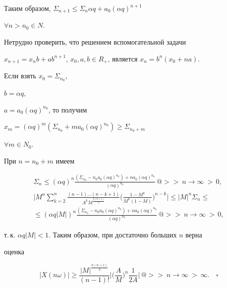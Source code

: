  


Таким образом, $\Sigma_{n+1}\le\Sigma_n \alpha q+a_0(\alpha q)^{n+1}$ 


$\forall n>n_0\in N$. 


 


Нетрудно проверить, что решением вспомогательной задачи 


$x_{n+1}=x_n b+a b^{n+1}$, $x_0,a,b\in R_+$, является $x_n=b^n(x_0+n a)$. 


Если взять $x_0=\Sigma_{n_0}$,


$b=\alpha q$,


$a=a_0(\alpha q)^{n_0}$, то получим 


$x_m=(\alpha q)^m(\Sigma_{n_0}+m a_0(\alpha q)^{n_0})\ge \Sigma_{n_0+m}$ 


$\forall m\in N_0$. 


При $n=n_0+m$ имеем 


\begin{gather*} 


\Sigma_n\le(\alpha q)^n 


\frac{(\Sigma_{n_0}-n_0a_0(\alpha q)^{n_0})+n a_0(\alpha q)^{n_0}} 


{(\alpha q)^{n_0}}\, @>>{\ n\to\infty\ }>\,0, \\ 


% 


\bigg|M^n\sum^n_{k=2}\frac{(n-1)\dotsc(n-k+1)} 


{A^k M^{\frac{k(k+1)}{2}}}\bigg(\frac{1-M^k}{M^k(1-M)} 


\bigg)^{n-k}\bigg|\le|M|^n\Sigma_n\le \\ \le


(\alpha q|M|)^n\frac{(\Sigma_{n_0}-n_0a_0(\alpha q)^{n_0})+ 


n a_0(\alpha q)^{n_0}} 


{(\alpha q)^{n_0}}\,@>>{\ n\to\infty\ }>\,0, 


\end{gather*} 


т.\,к. $\alpha q|M|<1$. Таким образом, при достаточно больших $n$ верна 


оценка 


$$ 


|X(n\omega)|\ge\frac{|M|^{\frac{n(n+1)}{2}}}{(n-1)!} 


\bigg|\bigg(\frac{A}{M}\bigg)^n\frac{1}{2A} \bigg|\, 


@>>{\ n\to\infty\ }>\,\infty.\quad\square 


$$ 


